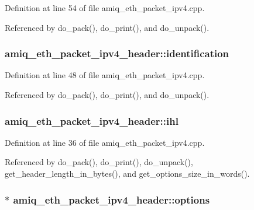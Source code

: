 Definition at line 54 of file amiq\_\-eth\_\-packet\_\-ipv4.cpp.

Referenced by do\_\-pack(), do\_\-print(), and do\_\-unpack().\hypertarget{classamiq__eth__packet__ipv4__header_aa98286d51e49bc5296fe0c1ab08214c3}{
\subsubsection[{identification}]{ {\bf amiq\_\-eth\_\-packet\_\-ipv4\_\-header::identification}}}
\label{classamiq__eth__packet__ipv4__header_aa98286d51e49bc5296fe0c1ab08214c3}


Definition at line 48 of file amiq\_\-eth\_\-packet\_\-ipv4.cpp.

Referenced by do\_\-pack(), do\_\-print(), and do\_\-unpack().\hypertarget{classamiq__eth__packet__ipv4__header_a1471c85788c2bda39aa344b62ba438d2}{
\subsubsection[{ihl}]{ {\bf amiq\_\-eth\_\-packet\_\-ipv4\_\-header::ihl}}}
\label{classamiq__eth__packet__ipv4__header_a1471c85788c2bda39aa344b62ba438d2}


Definition at line 36 of file amiq\_\-eth\_\-packet\_\-ipv4.cpp.

Referenced by do\_\-pack(), do\_\-print(), do\_\-unpack(), get\_\-header\_\-length\_\-in\_\-bytes(), and get\_\-options\_\-size\_\-in\_\-words().\hypertarget{classamiq__eth__packet__ipv4__header_a9dbcfcbb3889c13241a1e66f6221d177}{
\subsubsection[{options}]{$\ast$ {\bf amiq\_\-eth\_\-packet\_\-ipv4\_\-header::options}}}
\label{classamiq__eth__packet__ipv4__header_a9dbcfcbb3889c13241a1e66f6221d177}


